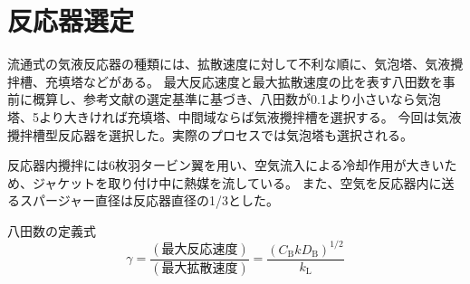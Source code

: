 \documentclass[a4j]{jsreport}
\begin{document}
\section{反応器選定}
流通式の気液反応器の種類には、拡散速度に対して不利な順に、気泡塔、気液攪拌槽、充填塔などがある。
最大反応速度と最大拡散速度の比を表す八田数を事前に概算し、参考文献\cite{化工便覧}の選定基準に基づき、八田数が0.1より小さいなら気泡塔、5より大きければ充填塔、中間域ならば気液攪拌槽を選択する。
今回は気液攪拌槽型反応器を選択した。実際のプロセスでは気泡塔も選択される。
\par
反応器内攪拌には6枚羽タービン翼を用い、空気流入による冷却作用が大きいため、ジャケットを取り付け中に熱媒を流している。
また、空気を反応器内に送るスパージャー直径は反応器直径の1/3とした。\\
\par 
八田数の定義式
\begin{equation}
    \gamma = \frac{(\text{最大反応速度})}{(\text{最大拡散速度})} = \frac{(C_{\mathrm{ B}}kD_{\mathrm{ B}})^{1/2}}{k_{\mathrm{ L}}}
\end{equation}
\end{document}
